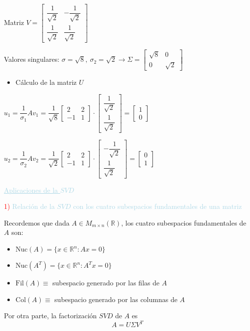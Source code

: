 \documentclass[12pt]{article}
\begin{document}
Matriz $V=\begin{bmatrix}
\dfrac{1}{\sqrt{2}} & -\dfrac{1}{\sqrt{2}} \\ 
\dfrac{1}{\sqrt{2}} & \dfrac{1}{\sqrt{2}}
\end{bmatrix} $

Valores singulares: $\sigma=\sqrt{8},~\sigma_2=\sqrt{2}\longrightarrow\Sigma=\begin{bmatrix}
\sqrt{8} & 0 \\ 
0 & \sqrt{2}
\end{bmatrix} $
\begin{itemize}[label=\color{red}\textbullet, leftmargin=*]
    \item \color{lightblue}Cálculo de la matriz $U$
\end{itemize}
$u_1=\dfrac{1}{\sigma_1}Av_1=\dfrac{1}{\sqrt{8}}\begin{bmatrix}
2 & 2 \\ 
-1 & 1
\end{bmatrix}\cdot\begin{bmatrix}
\dfrac{1}{\sqrt{2}}\\
\dfrac{1}{\sqrt{2}}
\end{bmatrix}=\begin{bmatrix}
1\\
0
\end{bmatrix} $

$u_2=\dfrac{1}{\sigma_2}Av_2=\dfrac{1}{\sqrt{2}}\begin{bmatrix}
2 & 2 \\ 
-1 & 1
\end{bmatrix}\cdot\begin{bmatrix}
-\dfrac{1}{\sqrt{2}}\\
\dfrac{1}{\sqrt{2}}
\end{bmatrix}=\begin{bmatrix}
0\\
1
\end{bmatrix} $

\textcolor{lightblue}{\underline{Aplicaciones de la $SVD$}}

\textcolor{red}{1) }\textcolor{lightblue}{Relación de la $SVD$ con los cuatro subespacios fundamentales de una matriz}

Recordemos que dada $A\in M_{m\times n}(\mathbb{R})$, los cuatro subespacios fundamentales de $A$ son:
\begin{itemize}
\item $\mathrm{Nuc}(A)=\{x\in\mathbb{R}^n:Ax=0\}$
\item $\mathrm{Nuc}(A^T)=\{x\in\mathbb{R}^n:A^Tx=0\}$
\item $\mathrm{Fil}(A)\equiv$ subespacio generado por las filas de $A$
\item $\mathrm{Col}(A)\equiv$ subespacio generado por las columnas de $A$
\end{itemize}
Por otra parte, la factorización $SVD$ de $A$ es \[A=U\Sigma V^T\]
\end{document}
